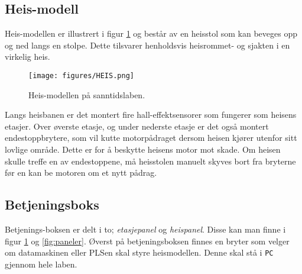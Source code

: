 \begin{alphasection}
\subsection{Heis-modell}
Heis-modellen er illustrert i figur \ref{fig:heis-modell-sal} og består av en heisstol som kan beveges opp og ned langs en stolpe. Dette tilsvarer henholdsvis heisrommet- og sjakten i en virkelig heis.

\begin{figure}[ht]
    \centering
    \texttt{[image: figures/HEIS.png]}
    \caption{Heis-modellen på sanntidslaben.}
    \label{fig:heis-modell-sal}
\end{figure}

Langs heisbanen er det montert fire hall-effektsensorer som fungerer som heisens etasjer. Over øverste etasje, og under nederste etasje er det også montert endestoppbrytere, som vil kutte motorpådraget dersom heisen kjører utenfor sitt lovlige område. Dette er for å beskytte heisens motor mot skade. Om heisen skulle treffe en av endestoppene, må heisstolen manuelt skyves bort fra bryterne før en kan be motoren om et nytt pådrag.

\subsection{Betjeningsboks}
Betjenings-boksen er delt i to; \textit{etasjepanel} og \textit{heispanel}. Disse kan man finne i figur \ref{fig:heis-modell-sal} og \ref{fig:paneler}. Øverst på betjeningsboksen finnes en bryter som velger om datamaskinen eller PLSen skal styre heismodellen. Denne skal stå i \verb|PC| gjennom hele laben.

\begin{figure}[ht]
    \centering
    




\begin{tikzpicture}[x=0.75pt,y=0.75pt,yscale=-1,xscale=1]


\end{tikzpicture}
\end{figure}
\end{alphasection}
